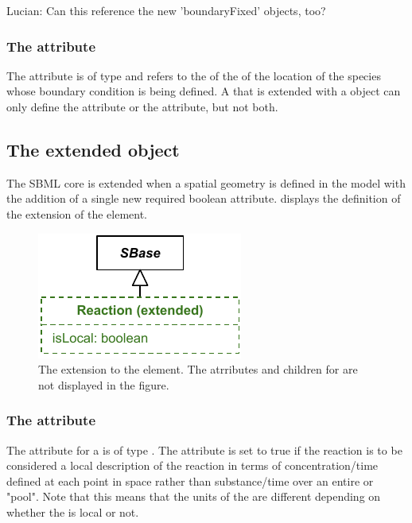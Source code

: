 {\color{red} Lucian: \notice Can this reference the new 'boundaryFixed' objects, too?}

\subsubsection{The  attribute}
The  attribute is of type  and refers to the  of the \DomainType of the location of the species whose boundary condition is being defined. A \Parameter that is extended with a \BoundaryCondition object can only define the  attribute or the  attribute, but not both. 


\subsection{The extended \Reaction object}
\label{extended-reaction-class}
The SBML core \Reaction is extended when a spatial geometry is defined in the model with the addition of a single new required boolean  attribute.  displays the definition of the extension of the \Reaction element.
 
\begin{figure}[ht]
  \includegraphics{figs/extended-reaction-uml}
  \caption{The extension to the \Reaction element. The \sbmlthreecore atrributes and children for \Reaction are not displayed in the figure.}
  \label{reaction-uml}
\end{figure}

\subsubsection{The  attribute}
The  attribute for a \Reaction is of type . The attribute is set to true if the reaction is to be considered a local description of the reaction in terms of concentration/time defined at each point in space rather than substance/time over an entire \Compartment or "pool".  Note that this means that the units of the \KineticLaw are different depending on whether the \Reaction is local or not.


